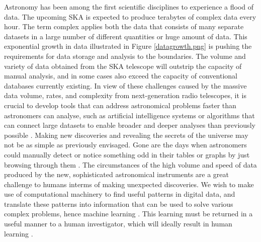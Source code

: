 Astronomy has been among the first scientific disciplines to experience a flood of data. The upcoming SKA is expected to produce terabytes of complex data every hour. The term complex applies both the data that consists of many separate datasets in a large number of different quantities or huge amount of data. This exponential growth in data illustrated in Figure \ref{datagrowth.png} is pushing the requirements for data storage and analysis to the boundaries. The volume and variety of data obtained from the SKA telescope will outstrip the capacity of manual analysis, and in some cases also exceed the capacity of conventional databases currently existing. In view of these challenges caused by the massive data volume, rates, and complexity from next-generation radio telescopes, it is crucial to develop tools that can address astronomical problems faster than astronomers can analyse, such as artificial intelligence systems or algorithms that can connect large datasets to enable broader and deeper analyses than previously possible \citep{provost2013data}. Making new discoveries and revealing the secrets of the universe may not be as simple as previously envisaged. Gone are the days when astronomers could manually detect or notice something odd in their tables or graphs by just browsing through them \citep{RayNorris}. The circumstances of the high volume and speed of data produced by the new, sophisticated astronomical instruments are a great challenge to humans interms of making unexpected discoveries. We wish to make use of computational machinery to
find useful patterns in digital data, and translate these patterns into information that can be used to solve various complex problems, hence machine learning \citep{ball2010data}. This learning must be returned in a useful manner to a human investigator, which will ideally result in human learning \citep{ball2010data}.